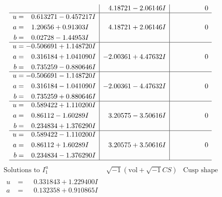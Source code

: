 \documentclass[1p]{elsarticle_modified}
\theoremstyle{definition}
\newcommand{\I}{\sqrt{-1}}
\begin{document}
$$\begin{array}{c|c|c}
 & \phantom{-}4.18721 - 2.06146 I & \phantom{-0.000000 } 0 \\ \hline\begin{aligned}
u &= \phantom{-}0.613271 - 0.457217 I \\
a &= \phantom{-}1.20656 + 0.91303 I \\
b &= \phantom{-}0.02728 - 1.44953 I\end{aligned}
 & \phantom{-}4.18721 + 2.06146 I & \phantom{-0.000000 } 0 \\ \hline\begin{aligned}
u &= -0.506691 + 1.148720 I \\
a &= \phantom{-}0.316184 + 1.041090 I \\
b &= \phantom{-}0.735259 - 0.880646 I\end{aligned}
 & -2.00361 + 4.47632 I & \phantom{-0.000000 } 0 \\ \hline\begin{aligned}
u &= -0.506691 - 1.148720 I \\
a &= \phantom{-}0.316184 - 1.041090 I \\
b &= \phantom{-}0.735259 + 0.880646 I\end{aligned}
 & -2.00361 - 4.47632 I & \phantom{-0.000000 } 0 \\ \hline\begin{aligned}
u &= \phantom{-}0.589422 + 1.110200 I \\
a &= \phantom{-}0.86112 - 1.60289 I \\
b &= \phantom{-}0.234834 + 1.376290 I\end{aligned}
 & \phantom{-}3.20575 - 3.50616 I & \phantom{-0.000000 } 0 \\ \hline\begin{aligned}
u &= \phantom{-}0.589422 - 1.110200 I \\
a &= \phantom{-}0.86112 + 1.60289 I \\
b &= \phantom{-}0.234834 - 1.376290 I\end{aligned}
 & \phantom{-}3.20575 + 3.50616 I & \phantom{-0.000000 } 0\\
 \hline 
 \end{array}$$\newpage$$\begin{array}{c|c|c}  
\text{Solutions to }I^u_{1}& \I (\text{vol} + \sqrt{-1}CS) & \text{Cusp shape}\\
 \hline 
\begin{aligned}
u &= \phantom{-}0.331843 + 1.229400 I \\
a &= \phantom{-}0.132358 + 0.910865 I \\

\end{aligned}
\end{array}$$
\end{document}
